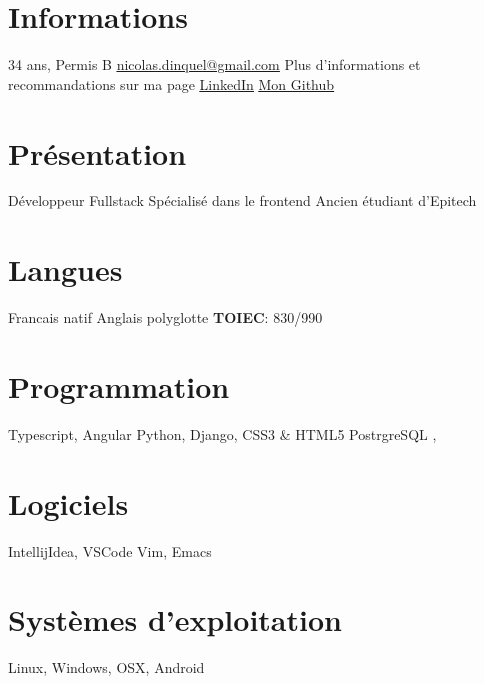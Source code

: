 \documentclass[]{friggeri-cv} %
\begin{document}
\begin{aside} %
\section{Informations}
34 ans, Permis B
\underline{\href{mailto:nicolas.dinquel@gmail.com}{nicolas.dinquel@gmail.com}}
Plus d'informations et recommandations sur ma page 	\underline{\href{https://fr.linkedin.com/in/nicolas-dinquel-70b50b4a}{LinkedIn}}
\underline{\href{https://github.com/Quayle57}{Mon Github}}
\section{Présentation}
Développeur Fullstack
Spécialisé dans le frontend
Ancien étudiant d'Epitech 
\section{Langues}
Francais natif
Anglais polyglotte
\textbf{TOIEC}: 830/990
\section{Programmation}
Typescript, Angular
Python, Django,
CSS3 \& HTML5
PostrgreSQL
,
\section{Logiciels}
IntellijIdea, VSCode
Vim, Emacs
\section{Systèmes d'exploitation}
Linux, Windows, OSX, Android
\end{aside}
\end{document}
